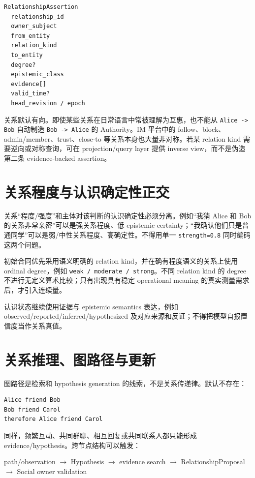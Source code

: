 \begin{verbatim}
RelationshipAssertion
  relationship_id
  owner_subject
  from_entity
  relation_kind
  to_entity
  degree?
  epistemic_class
  evidence[]
  valid_time?
  head_revision / epoch
\end{verbatim}

关系默认有向。即使某些关系在日常语言中常被理解为互惠，也不能从 \texttt{Alice -> Bob} 自动制造 \texttt{Bob -> Alice} 的 Authority。IM 平台中的 follow、block、admin/member、trust、close-to 等关系本身也大量非对称。若某 relation kind 需要逆向或对称查询，可在 projection/query layer 提供 inverse view，而不是伪造第二条 evidence-backed assertion。

\section{关系程度与认识确定性正交}

关系“程度/强度”和主体对该判断的认识确定性必须分离。例如“我猜 Alice 和 Bob 的关系非常亲密”可以是强关系程度、低 epistemic certainty；“我确认他们只是普通同学”可以是弱/中性关系程度、高确定性。不得用单一 \texttt{strength=0.8} 同时编码这两个问题。

初始合同优先采用语义明确的 relation kind，并在确有程度语义的关系上使用 ordinal degree，例如 \texttt{weak / moderate / strong}。不同 relation kind 的 degree 不进行无定义算术比较；只有出现具有稳定 operational meaning 的真实测量需求后，才引入连续量。

认识状态继续使用证据与 epistemic semantics 表达，例如 observed/reported/inferred/hypothesized 及对应来源和反证；不得把模型自报置信度当作关系真值。

\section{关系推理、图路径与更新}

图路径是检索和 hypothesis generation 的线索，不是关系传递律。默认不存在：

\begin{verbatim}
Alice friend Bob
Bob friend Carol
therefore Alice friend Carol
\end{verbatim}

同样，频繁互动、共同群聊、相互回复或共同联系人都只能形成 evidence/hypothesis。跨节点结构可以触发：

\begin{center}
path/observation $\rightarrow$ Hypothesis $\rightarrow$ evidence search $\rightarrow$ RelationshipProposal $\rightarrow$ Social owner validation
\end{center}

